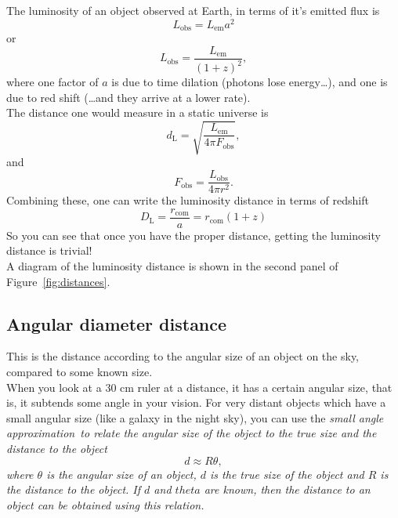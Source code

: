 \documentclass[]{article}
\begin{document}
\noindent The luminosity of an object observed at Earth, in terms of it’s emitted flux is 
\begin{equation}
L_\mathrm{obs} = L_\mathrm{em}a^2
\end{equation}
or
\begin{equation}
L_\mathrm{obs} = \frac{L_\mathrm{em}}{(1+z)^2},
\end{equation}
where one factor of $a$ is due to time dilation (photons lose energy…), and one is due to red shift (…and they arrive at a lower rate).\\

\noindent The distance one would measure in a static universe is
\begin{equation}
d_\mathrm{L} = \sqrt{\frac{L_\mathrm{em}}{4\pi F_\mathrm{obs}}},
\end{equation}
and 
\begin{equation}
F_\mathrm{obs} = \frac{L_\mathrm{obs}}{4\pi r^2}.
\end{equation}
Combining these, one can write the luminosity distance in terms of redshift
\begin{equation}
\boxed{D_\mathrm{L} = \frac{r_\mathrm{com}}{a} = r_\mathrm{com} (1+z)}
\end{equation}
So you can see that once you have the proper distance, getting the luminosity distance is trivial! \\

\noindent A diagram of the luminosity distance is shown in the second panel of Figure~\ref{fig:distances}.

\subsection{Angular diameter distance}
This is the distance according to the angular size of an object on the sky, compared to some known size.\\ 

\noindent When you look at a 30 cm ruler at a distance, it has a certain angular size, that is, it subtends some angle in your vision. For very distant objects which have a small angular size (like a galaxy in the night sky), you can use the \itshape small angle approximation~\upshape to relate the angular size of the object to the true size and the distance to the object
\begin{equation}
d \approx R \theta,
\end{equation}
where $\theta$ is the angular size of an object, $d$ is the true size of the object and $R$ is the distance to the object. If $d$ and $theta$ are known, then the distance to an object can be obtained using this relation. \\
\end{document}

